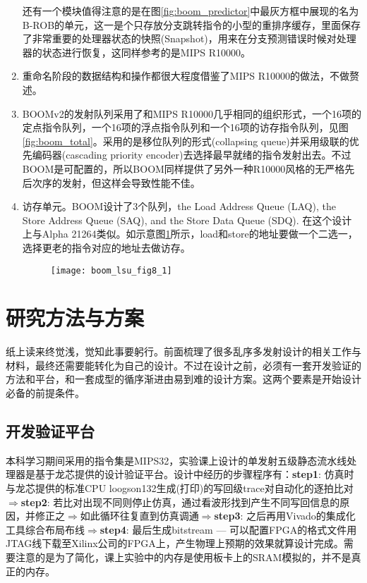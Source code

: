 \begin{enumerate}[label=(\alph*)]
		还有一个模块值得注意的是在图\ref{fig:boom_predictor}中最灰方框中展现的名为B-ROB的单元，这一是个只存放分支跳转指令的小型的重排序缓存，里面保存了非常重要的处理器状态的快照(Snapshot)，用来在分支预测错误时候对处理器的状态进行恢复，这同样参考的是MIPS R10000。
		\item 重命名阶段的数据结构和操作都很大程度借鉴了MIPS R10000的做法，不做赘述。
		\item BOOMv2的发射队列采用了和MIPS R10000几乎相同的组织形式，一个16项的定点指令队列，一个16项的浮点指令队列和一个16项的访存指令队列，见图\ref{fig:boom_total}。采用的是移位队列的形式(collapsing queue)并采用级联的优先编码器(cascading priority encoder)去选择最早就绪的指令发射出去\citep{Celio:EECS-2017-157}。不过BOOM是可配置的，所以BOOM同样提供了另外一种R10000风格的无严格先后次序的发射，但这样会导致性能不佳。
		\item 访存单元。BOOM设计了3个队列，the Load Address Queue (LAQ), the Store Address Queue (SAQ), and the Store Data Queue (SDQ)\citep{BOOMDoc2018}. 在这个设计上与Alpha 21264类似。如示意图\ref{fig:LSU}所示，load和store的地址要做一个二选一，选择更老的指令对应的地址去做访存。
		\begin{figure}[!htbp]
			\centering
			\texttt{[image: boom\_lsu\_fig8\_1]}
			\label{fig:LSU}
		\end{figure}
	\end{enumerate}

\section{研究方法与方案}
	纸上读来终觉浅，觉知此事要躬行。前面梳理了很多乱序多发射设计的相关工作与材料，最终还需要能转化为自己的设计。不过在设计之前，必须有一套开发验证的方法和平台，和一套成型的循序渐进由易到难的设计方案。这两个要素是开始设计必备的前提条件。
	
	\subsection{开发验证平台}
	
	本科学习期间采用的指令集是MIPS32，实验课上设计的单发射五级静态流水线处理器是基于龙芯提供的设计验证平台。设计中经历的步骤程序有：\textbf{step1}: 仿真时与龙芯提供的标准CPU loogson132生成(打印)的写回级trace对自动化的逐拍比对$ \Rightarrow $\textbf{step2}: 若比对出现不同则停止仿真，通过看波形找到产生不同写回信息的原因，并修正之$ \Rightarrow $如此循环往复直到仿真调通$ \Rightarrow $\textbf{step3}: 之后再用Vivado的集成化工具综合布局布线$ \Rightarrow $\textbf{step4}: 最后生成bitstream --- 可以配置FPGA的格式文件用JTAG线下载至Xilinx公司的FPGA上，产生物理上预期的效果就算设计完成。需要注意的是为了简化，课上实验中的内存是使用板卡上的SRAM模拟的，并不是真正的内存。
	
